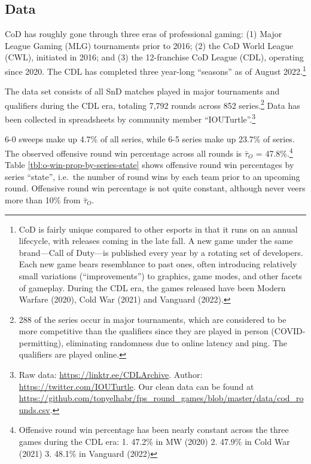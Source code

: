 \documentclass{article}
\begin{document}
\hypertarget{data}{%
\subsection{Data}\label{data}}

CoD has roughly gone through three eras of professional gaming: (1)
Major League Gaming (MLG) tournaments prior to 2016; (2) the CoD World
League (CWL), initiated in 2016; and (3) the 12-franchise CoD League
(CDL), operating since 2020. The CDL has completed three year-long
``seasons'' as of August 2022.\footnote{CoD is fairly unique compared to
  other esports in that it runs on an annual lifecycle, with releases
  coming in the late fall. A new game under the same brand---Call of
  Duty---is published every year by a rotating set of developers. Each
  new game bears resemblance to past ones, often introducing relatively
  small variations (``improvements'') to graphics, game modes, and other
  facets of gameplay. During the CDL era, the games released have been
  Modern Warfare (2020), Cold War (2021) and Vanguard (2022).}

The data set consists of all SnD matches played in major tournaments and
qualifiers during the CDL era, totaling 7,792 rounds across 852
series.\footnote{288 of the series occur in major tournaments, which are
  considered to be more competitive than the qualifiers since they are
  played in person (COVID-permitting), eliminating randomness due to
  online latency and ping. The qualifiers are played online.} Data has
been collected in spreadsheets by community member
``IOUTurtle''.\footnote{Raw data: \url{https://linktr.ee/CDLArchive}.
  Author: \url{https://twitter.com/IOUTurtle}. Our clean data can be
  found at
  \url{https://github.com/tonyelhabr/fps_round_games/blob/master/data/cod_rounds.csv}.}

6-0 sweeps make up 4.7\% of all series, while 6-5 series make up 23.7\%
of series. The observed offensive round win percentage across all rounds
is \(\bar{\tau}_O\) = 47.8\%.\footnote{Offensive round win percentage
  has been nearly constant across the three games during the CDL era: 1.
  47.2\% in MW (2020) 2. 47.9\% in Cold War (2021) 3. 48.1\% in Vanguard
  (2022)} Table \ref{tbl:o-win-prop-by-series-state} shows offensive
round win percentages by series ``state'', i.e.~the number of round wins
by each team prior to an upcoming round. Offensive round win percentage
is not quite constant, although never veers more than 10\% from
\(\bar{\tau}_O\).
\end{document}
